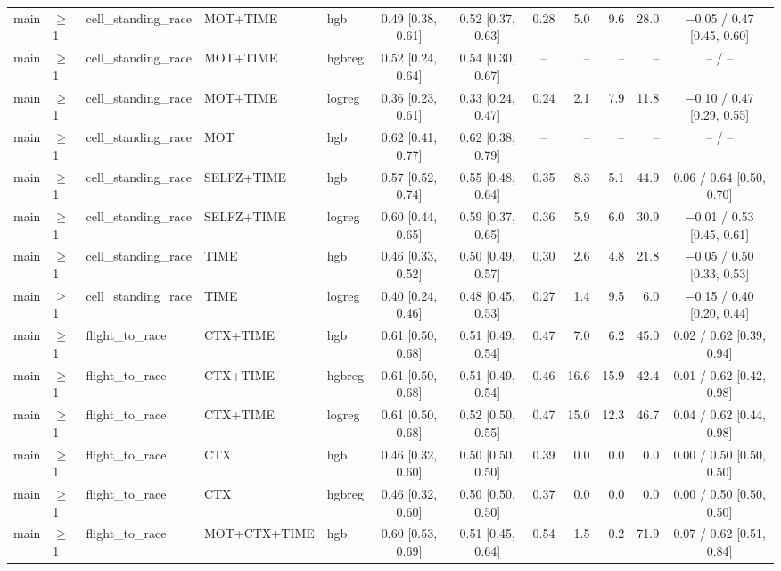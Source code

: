 \begin{longtable}{@{}lllllcccrrrc@{}}
main & $\geq$1 & cell\_standing\_race & MOT+TIME & hgb & 0.49 [0.38, 0.61] & 0.52 [0.37, 0.63] & 0.28 & 5.0 & 9.6 & 28.0 & $-$0.05 / 0.47 [0.45, 0.60] \\
main & $\geq$1 & cell\_standing\_race & MOT+TIME & hgbreg & 0.52 [0.24, 0.64] & 0.54 [0.30, 0.67] & -- & -- & -- & -- & -- / -- \\
main & $\geq$1 & cell\_standing\_race & MOT+TIME & logreg & 0.36 [0.23, 0.61] & 0.33 [0.24, 0.47] & 0.24 & 2.1 & 7.9 & 11.8 & $-$0.10 / 0.47 [0.29, 0.55] \\
main & $\geq$1 & cell\_standing\_race & MOT & hgb & 0.62 [0.41, 0.77] & 0.62 [0.38, 0.79] & -- & -- & -- & -- & -- / -- \\
main & $\geq$1 & cell\_standing\_race & SELFZ+TIME & hgb & 0.57 [0.52, 0.74] & 0.55 [0.48, 0.64] & 0.35 & 8.3 & 5.1 & 44.9 & 0.06 / 0.64 [0.50, 0.70] \\
main & $\geq$1 & cell\_standing\_race & SELFZ+TIME & logreg & 0.60 [0.44, 0.65] & 0.59 [0.37, 0.65] & 0.36 & 5.9 & 6.0 & 30.9 & $-$0.01 / 0.53 [0.45, 0.61] \\
main & $\geq$1 & cell\_standing\_race & TIME & hgb & 0.46 [0.33, 0.52] & 0.50 [0.49, 0.57] & 0.30 & 2.6 & 4.8 & 21.8 & $-$0.05 / 0.50 [0.33, 0.53] \\
main & $\geq$1 & cell\_standing\_race & TIME & logreg & 0.40 [0.24, 0.46] & 0.48 [0.45, 0.53] & 0.27 & 1.4 & 9.5 & 6.0 & $-$0.15 / 0.40 [0.20, 0.44] \\
main & $\geq$1 & flight\_to\_race & CTX+TIME & hgb & 0.61 [0.50, 0.68] & 0.51 [0.49, 0.54] & 0.47 & 7.0 & 6.2 & 45.0 & 0.02 / 0.62 [0.39, 0.94] \\
main & $\geq$1 & flight\_to\_race & CTX+TIME & hgbreg & 0.61 [0.50, 0.68] & 0.51 [0.49, 0.54] & 0.46 & 16.6 & 15.9 & 42.4 & 0.01 / 0.62 [0.42, 0.98] \\
main & $\geq$1 & flight\_to\_race & CTX+TIME & logreg & 0.61 [0.50, 0.68] & 0.52 [0.50, 0.55] & 0.47 & 15.0 & 12.3 & 46.7 & 0.04 / 0.62 [0.44, 0.98] \\
main & $\geq$1 & flight\_to\_race & CTX & hgb & 0.46 [0.32, 0.60] & 0.50 [0.50, 0.50] & 0.39 & 0.0 & 0.0 & 0.0 & 0.00 / 0.50 [0.50, 0.50] \\
main & $\geq$1 & flight\_to\_race & CTX & hgbreg & 0.46 [0.32, 0.60] & 0.50 [0.50, 0.50] & 0.37 & 0.0 & 0.0 & 0.0 & 0.00 / 0.50 [0.50, 0.50] \\
main & $\geq$1 & flight\_to\_race & MOT+CTX+TIME & hgb & 0.60 [0.53, 0.69] & 0.51 [0.45, 0.64] & 0.54 & 1.5 & 0.2 & 71.9 & 0.07 / 0.62 [0.51, 0.84] \\

\end{longtable}
